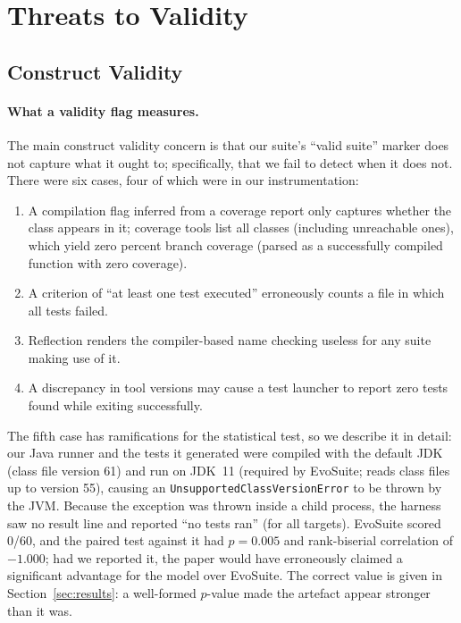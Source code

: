 \section{Threats to Validity}\label{sec:threats}

\subsection{Construct Validity}

\paragraph{What a validity flag measures.}
The main construct validity concern is that our suite's ``valid suite'' marker does not capture
what it ought to; specifically, that we fail to detect when it does not. There were six cases,
four of which were in our instrumentation:

\begin{enumerate}
  \item A compilation flag inferred from a coverage report only captures whether the class
    appears in it; coverage tools list all classes (including unreachable ones), which yield
    zero percent branch coverage (parsed as a successfully compiled function with zero
    coverage).
  \item A criterion of ``at least one test executed'' erroneously counts a file in which all
    tests failed.
  \item Reflection renders the compiler-based name checking useless for any suite making use
    of it.
  \item A discrepancy in tool versions may cause a test launcher to report zero tests found
    while exiting successfully.
\end{enumerate}

The fifth case has ramifications for the statistical test, so we describe it in detail: our
Java runner and the tests it generated were compiled with the default JDK (class file version
61) and run on JDK~11 (required by EvoSuite; reads class files up to version 55), causing an
\texttt{UnsupportedClassVersionError} to be thrown by the JVM. Because the exception was thrown
inside a child process, the harness saw no result line and reported ``no tests ran'' (for all
targets). EvoSuite scored 0/60, and the paired test against it had $p = 0.005$ and rank-biserial
correlation of $-1.000$; had we reported it, the paper would have erroneously claimed a
significant advantage for the model over EvoSuite. The correct value is given in
Section~\ref{sec:results}: a well-formed $p$-value made the artefact appear stronger than it
was.

